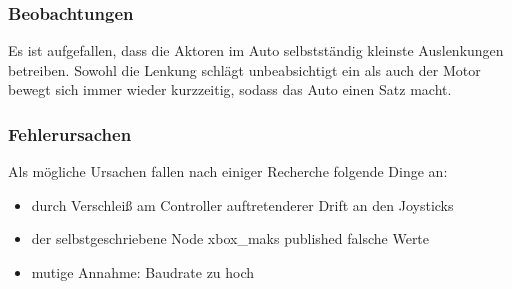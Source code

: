 \subsubsection{Beobachtungen}
Es ist aufgefallen, dass die Aktoren im Auto selbstständig kleinste Auslenkungen betreiben. Sowohl die Lenkung schlägt unbeabsichtigt ein als auch der Motor bewegt sich immer wieder kurzzeitig, sodass das Auto einen Satz macht.

\subsubsection{Fehlerursachen}

Als mögliche Ursachen fallen nach einiger Recherche folgende Dinge an:
\begin{itemize}
	\item durch Verschleiß am Controller auftretenderer Drift an den Joysticks
	\item der selbstgeschriebene Node xbox\_maks published falsche Werte
	\item mutige Annahme: Baudrate zu hoch
\end{itemize}

